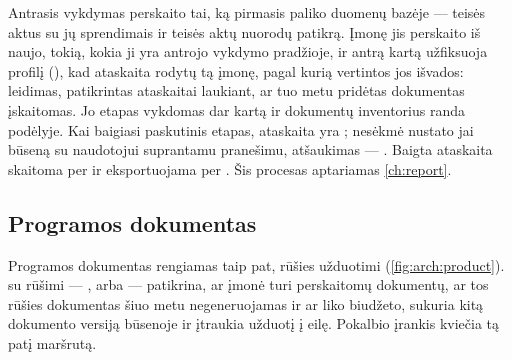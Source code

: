 Antrasis vykdymas perskaito tai, ką pirmasis paliko duomenų bazėje --- teisės aktus su jų
sprendimais ir teisės aktų nuorodų patikrą. Įmonę jis perskaito iš naujo, tokią, kokia ji yra
antrojo vykdymo pradžioje, ir antrą kartą užfiksuoja profilį (), kad
ataskaita rodytų tą įmonę, pagal kurią vertintos jos išvados: leidimas, patikrintas ataskaitai
laukiant, ar tuo metu pridėtas dokumentas įskaitomas. Jo  etapas vykdomas dar
kartą ir dokumentų inventorius randa podėlyje.
Kai baigiasi paskutinis etapas, ataskaita yra ; nesėkmė nustato jai būseną
 su naudotojui suprantamu pranešimu, atšaukimas --- . Baigta
ataskaita skaitoma per  ir eksportuojama per
. Šis procesas aptariamas \cref{ch:report}.

\subsection{Programos dokumentas}

Programos dokumentas rengiamas taip pat,  rūšies užduotimi
(\cref{fig:arch:product}).  su rūšimi ---
,  arba  --- patikrina, ar įmonė turi perskaitomų
dokumentų, ar tos rūšies dokumentas šiuo metu negeneruojamas ir ar liko biudžeto, sukuria
kitą dokumento versiją būsenoje  ir įtraukia užduotį į eilę. Pokalbio įrankis
 kviečia tą patį maršrutą.

